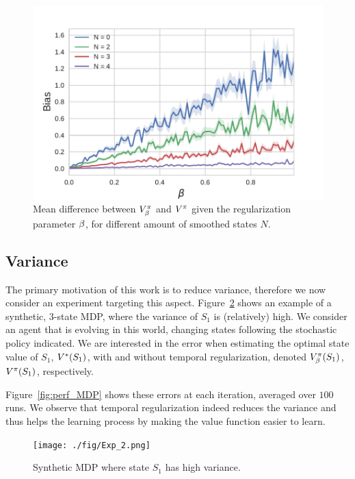 \begin{figure}
	\centering

	\includegraphics[scale=0.7]{./fig/Bias_N.pdf}
\caption{Mean difference between $V_{\beta}^{\pi}$ and $V^{\pi}$ given the regularization parameter $\beta$, for different amount of smoothed states $N$.}
\label{fig:mod}
\end{figure}


\subsection{Variance}
\label{sec:expe:variance}
The primary motivation of this work is to reduce variance, therefore we now consider an experiment  targeting this aspect. Figure~\ref{fig:MDP} shows an example of a synthetic, 3-state MDP, where the variance of $S_1$ is (relatively) high. We consider an agent that is evolving in this world, changing states following the stochastic policy indicated. We are interested in the error when estimating the optimal state value of $S_1$, $V^*(S_1)$, with and without temporal regularization, denoted $V_{\beta}^{\pi}(S_1)$, $V^{\pi}(S_1)$, respectively.

Figure~\ref{fig:perf_MDP} shows these errors at each iteration, averaged over $100$ runs. We observe that temporal regularization indeed reduces the variance and thus helps the learning process by making the value function easier to learn.

\begin{figure}
	\centering

	\texttt{[image: ./fig/Exp\_2.png]}
\caption{Synthetic MDP where state $S_1$ has high variance.}
\label{fig:MDP}
\end{figure}

